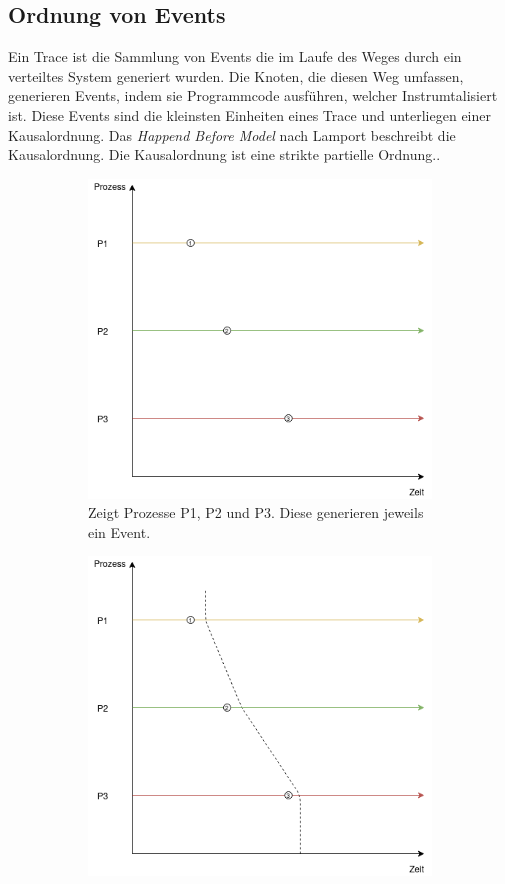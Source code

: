 \subsection{Ordnung von Events}
\label{subsection:Ordnung von Events}
	
Ein Trace ist die Sammlung von Events die im Laufe des Weges durch ein verteiltes System generiert wurden. Die Knoten, die diesen Weg umfassen, generieren Events, indem sie Programmcode ausführen, welcher Instrumtalisiert ist. Diese Events sind die kleinsten Einheiten eines Trace und unterliegen einer Kausalordnung. Das \emph{Happend Before Model} nach Lamport beschreibt die Kausalordnung. Die Kausalordnung ist eine strikte partielle Ordnung.. 

\begin{figure}[!ht]
	\centering
	\begin{subfigure}[t]{.49\linewidth}
		\centering\includegraphics[width=.8\linewidth]{img/Themenueberblick/PartialOrdering_Concurrent.png}
		\caption[Abbildung]{Zeigt Prozesse P1, P2 und P3. Diese generieren jeweils ein Event.}
		\label{fig:Partial_Ordering_Concurrent_explained_1}
	\end{subfigure}
	\begin{subfigure}[t]{.49\linewidth}
		\centering\includegraphics[width=.8\linewidth]{img/Themenueberblick/PartialOrdering_Concurrent_Explained}

\end{subfigure}
\end{figure}
